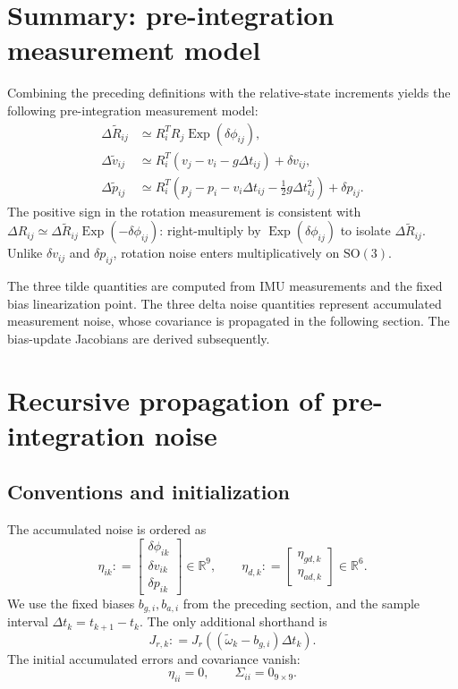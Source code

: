 \documentclass[11pt,a4paper]{article}
\newcommand{\Exp}{\operatorname{Exp}}
\newcommand{\SO}{\mathrm{SO}}
\newcommand{\defeq}{\mathrel{\mathop:}=}
\begin{document}
\section{Summary: pre-integration measurement model}
Combining the preceding definitions with the relative-state increments
yields the following pre-integration measurement model:
\begin{subequations}\label{eq:measurementSummary}
\begin{align}
\boxed{\Delta\tilde R_{ij}}
&\simeq R_i^TR_j\Exp(\delta\phi_{ij}),\\
\boxed{\Delta\tilde v_{ij}}
&\simeq R_i^T(v_j-v_i-g\Delta t_{ij})+\delta v_{ij},\\
\boxed{\Delta\tilde p_{ij}}
&\simeq R_i^T\left(p_j-p_i-v_i\Delta t_{ij}
-\tfrac12g\Delta t_{ij}^2\right)+\delta p_{ij}.
\end{align}
\end{subequations}
The positive sign in the rotation measurement is consistent with
$\Delta R_{ij}\simeq\Delta\tilde R_{ij}\Exp(-\delta\phi_{ij})$:
right-multiply by $\Exp(\delta\phi_{ij})$ to isolate
$\Delta\tilde R_{ij}$. Unlike $\delta v_{ij}$ and $\delta p_{ij}$,
rotation noise enters multiplicatively on $\SO(3)$.

The three tilde quantities are computed from IMU measurements and the
fixed bias linearization point. The three delta noise quantities represent
accumulated measurement noise, whose covariance is propagated in the
following section. The bias-update Jacobians are derived subsequently.


\section{Recursive propagation of pre-integration noise}
\subsection{Conventions and initialization}
The accumulated noise is ordered as
\begin{equation}
\eta_{ik}\defeq\begin{bmatrix}\delta\phi_{ik}\\\delta v_{ik}\\\delta p_{ik}\end{bmatrix}\in\mathbb R^9,
\qquad
\eta_{d,k}\defeq\begin{bmatrix}\eta_{gd,k}\\\eta_{ad,k}\end{bmatrix}\in\mathbb R^6.
\end{equation}
We use the fixed biases $b_{g,i},b_{a,i}$ from the preceding section, and the sample interval $\Delta t_k=t_{k+1}-t_k$. The only additional shorthand is
\begin{equation}
J_{r,k}\defeq J_r\!\left((\tilde\omega_k-b_{g,i})\Delta t_k\right).
\end{equation}
The initial accumulated errors and covariance vanish:
\begin{equation}
\eta_{ii}=0,\qquad \Sigma_{ii}=0_{9\times9}.
\end{equation}
\end{document}
